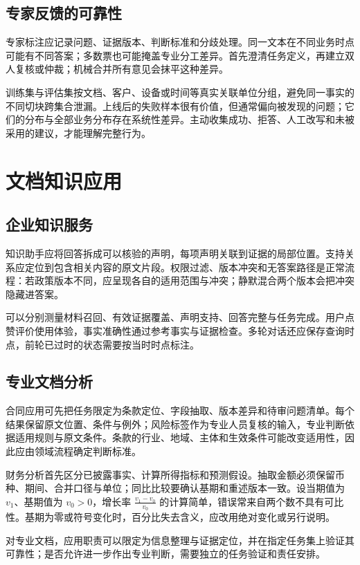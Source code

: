 \documentclass[../textbook.tex]{subfiles}
\begin{document}
\subsection{专家反馈的可靠性}
专家标注应记录问题、证据版本、判断标准和分歧处理。同一文本在不同业务时点可能有不同答案；多数票也可能掩盖专业分工差异。首先澄清任务定义，再建立双人复核或仲裁；机械合并所有意见会抹平这种差异。

训练集与评估集按文档、客户、设备或时间等真实关联单位分组，避免同一事实的不同切块跨集合泄漏。上线后的失败样本很有价值，但通常偏向被发现的问题；它们的分布与全部业务分布存在系统性差异。主动收集成功、拒答、人工改写和未被采用的建议，才能理解完整行为。

\section{文档知识应用}
\optional
\subsection{企业知识服务}
知识助手应将回答拆成可以核验的声明，每项声明关联到证据的局部位置。支持关系应定位到包含相关内容的原文片段。权限过滤、版本冲突和无答案路径是正常流程：若政策版本不同，应呈现各自的适用范围与冲突；静默混合两个版本会把冲突隐藏进答案。

可以分别测量材料召回、有效证据覆盖、声明支持、回答完整与任务完成。用户点赞评价使用体验，事实准确性通过参考事实与证据检查。多轮对话还应保存查询时点，前轮已过时的状态需要按当时时点标注。

\subsection{专业文档分析}
合同应用可先把任务限定为条款定位、字段抽取、版本差异和待审问题清单。每个结果保留原文位置、条件与例外；风险标签作为专业人员复核的输入，专业判断依据适用规则与原文条件。条款的行业、地域、主体和生效条件可能改变适用性，因此应由领域流程确定判断标准。

财务分析首先区分已披露事实、计算所得指标和预测假设。抽取金额必须保留币种、期间、合并口径与单位；同比比较要确认基期和重述版本一致。设当期值为 $v_1$、基期值为 $v_0>0$，增长率 $\frac{v_1-v_0}{v_0}$ 的计算简单，错误常来自两个数不具有可比性。基期为零或符号变化时，百分比失去含义，应改用绝对变化或另行说明。

\begin{note}[专业任务的验证与责任范围]
对专业文档，应用职责可以限定为信息整理与证据定位，并在指定任务集上验证其可靠性；是否允许进一步作出专业判断，需要独立的任务验证和责任安排。
\end{note}
\end{document}
